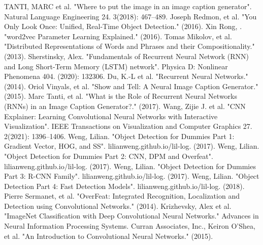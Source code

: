 \begin{thebibliography}{}
 TANTI, MARC et al. "Where to put the image in an image caption generator". Natural Language Engineering 24. 3(2018): 467–489.
Joseph Redmon, et al. "You Only Look Once: Unified, Real-Time Object Detection." (2016).
Xin Rong, . "word2vec Parameter Learning Explained." (2016).
Tomas Mikolov, et al. "Distributed Representations of Words and Phrases and their Compositionality." (2013).
Sherstinsky, Alex. "Fundamentals of Recurrent Neural Network (RNN) and Long Short-Term Memory (LSTM) network". Physica D: Nonlinear Phenomena 404. (2020): 132306.
Du, K.-L et al. "Recurrent Neural Networks." (2014). 
Oriol Vinyals, et al. "Show and Tell: A Neural Image Caption Generator." (2015).
Marc Tanti, et al. "What is the Role of Recurrent Neural Networks (RNNs) in an Image Caption Generator?." (2017).
Wang, Zijie J. et al. "CNN Explainer: Learning Convolutional Neural Networks with Interactive Visualization". IEEE Transactions on Visualization and Computer Graphics 27. 2(2021): 1396–1406.
Weng, Lilian. "Object Detection for Dummies Part 1: Gradient Vector, HOG, and SS". lilianweng.github.io/lil-log. (2017).
Weng, Lilian. "Object Detection for Dummies Part 2: CNN, DPM and Overfeat". lilianweng.github.io/lil-log. (2017).
Weng, Lilian. "Object Detection for Dummies Part 3: R-CNN Family". lilianweng.github.io/lil-log. (2017).
Weng, Lilian. "Object Detection Part 4: Fast Detection Models". lilianweng.github.io/lil-log. (2018).
Pierre Sermanet, et al. "OverFeat: Integrated Recognition, Localization and Detection using Convolutional Networks." (2014).
Krizhevsky, Alex et al. "ImageNet Classification with Deep Convolutional Neural Networks." Advances in Neural Information Processing Systems. Curran Associates, Inc.,
Keiron O'Shea, et al. "An Introduction to Convolutional Neural Networks." (2015).
\end{thebibliography}
